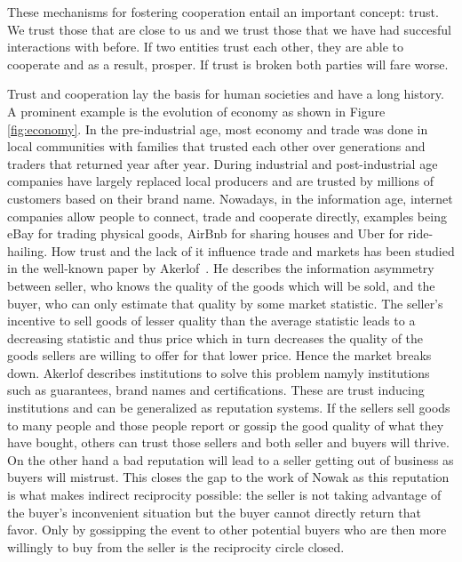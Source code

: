 These mechanisms for fostering cooperation entail an important concept: trust. We trust those that
are close to us and we trust those that we have had succesful interactions with before. If two
entities trust each other, they are able to cooperate and as a result, prosper. If trust is broken
both parties will fare worse. 


Trust and cooperation lay the basis for human societies and have a long history. A prominent example
is the evolution of economy as shown in Figure \ref{fig:economy}. In the pre-industrial age, most economy and trade was done in local
communities with families that trusted each other over generations and traders that returned year
after year. During industrial and post-industrial age companies have largely replaced local 
producers and are trusted by millions of customers based on their brand name. Nowadays, in the 
information age, internet companies allow people to connect, trade and cooperate directly, examples
being eBay for trading physical goods, AirBnb for sharing houses and Uber for ride-hailing. How trust
and the lack of it influence trade and markets has been studied in the well-known paper by 
Akerlof~\cite{akerlof1970lemons}. He describes the information asymmetry between seller, who knows
the quality of the goods which will be sold, and the buyer, who can only estimate that quality by 
some market statistic. The seller's incentive to sell goods of lesser quality than the average 
statistic leads to a decreasing statistic and thus price which in turn decreases the quality of the 
goods sellers are willing to offer for that lower price. Hence the market breaks down. Akerlof
describes institutions to solve this problem namyly institutions such as guarantees, brand names and
certifications. These are trust inducing institutions and can be generalized as reputation systems.
If the sellers sell goods to many people and those people report or gossip the good quality of what
they have bought, others can trust those sellers and both seller and buyers will thrive. On the 
other hand a bad reputation will lead to a seller getting out of business as buyers will mistrust.
This closes the gap to the work of Nowak as this reputation is what makes indirect reciprocity
possible: the seller is not taking advantage of the buyer's inconvenient situation but the buyer
cannot directly return that favor. Only by gossipping the event to other potential buyers who are 
then more willingly to buy from the seller is the reciprocity circle closed.~\cite{nowak2006five}


